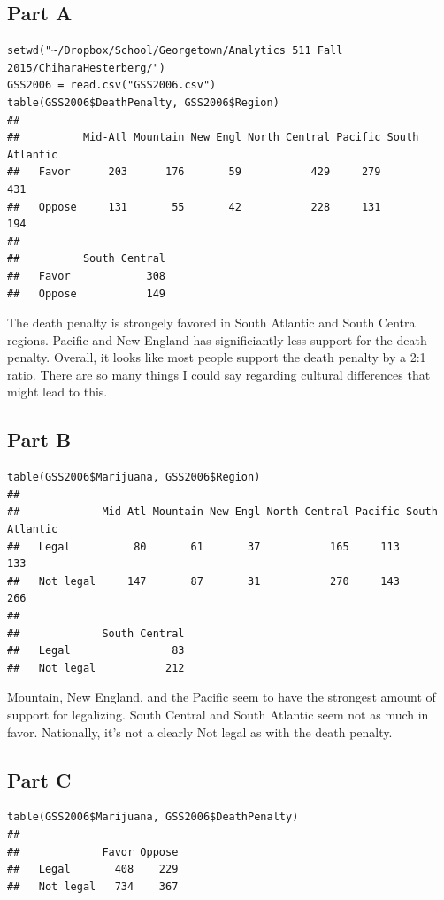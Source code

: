\documentclass{article}\usepackage[]{graphicx}\usepackage[]{color}
\makeatletter
\newenvironment{kframe}{%
 \def\at@end@of@kframe{}%
 \ifinner\ifhmode%
  \def\at@end@of@kframe{\end{minipage}}%
  \begin{minipage}{\columnwidth}%
 \fi\fi%
 \def\FrameCommand##1{\hskip\@totalleftmargin \hskip-\fboxsep
 \colorbox{shadecolor}{##1}\hskip-\fboxsep
     \hskip-\linewidth \hskip-\@totalleftmargin \hskip\columnwidth}%
 \MakeFramed {\advance\hsize-\width
   \@totalleftmargin\z@ \linewidth\hsize
   \@setminipage}}%
 {\par\unskip\endMakeFramed%
 \at@end@of@kframe}
\newenvironment{knitrout}{}{} %
\makeatother
\begin{document}
\subsection*{Part A}
\begin{knitrout}
\color{fgcolor}\begin{kframe}
\begin{verbatim}
setwd("~/Dropbox/School/Georgetown/Analytics 511 Fall 2015/ChiharaHesterberg/")
GSS2006 = read.csv("GSS2006.csv")
table(GSS2006$DeathPenalty, GSS2006$Region)
##         
##          Mid-Atl Mountain New Engl North Central Pacific South Atlantic
##   Favor      203      176       59           429     279            431
##   Oppose     131       55       42           228     131            194
##         
##          South Central
##   Favor            308
##   Oppose           149
\end{verbatim}
\end{kframe}
\end{knitrout}
The death penalty is strongely favored in South Atlantic and South Central regions. Pacific and New England has significiantly less support for the death penalty. Overall, it looks like most people support the death penalty by a 2:1 ratio. There are so many things I could say regarding cultural differences that might lead to this.   
\subsection*{Part B}
\begin{knitrout}
\color{fgcolor}\begin{kframe}
\begin{verbatim}
table(GSS2006$Marijuana, GSS2006$Region)
##            
##             Mid-Atl Mountain New Engl North Central Pacific South Atlantic
##   Legal          80       61       37           165     113            133
##   Not legal     147       87       31           270     143            266
##            
##             South Central
##   Legal                83
##   Not legal           212
\end{verbatim}
\end{kframe}
\end{knitrout}
Mountain, New England, and the Pacific seem to have the strongest amount of support for legalizing. South Central and South Atlantic seem not as much in favor. Nationally, it's not a clearly Not legal as with the death penalty.
\subsection*{Part C}
\begin{knitrout}
\color{fgcolor}\begin{kframe}
\begin{verbatim}
table(GSS2006$Marijuana, GSS2006$DeathPenalty)
##            
##             Favor Oppose
##   Legal       408    229
##   Not legal   734    367
\end{verbatim}
\end{kframe}
\end{knitrout}
\end{document}
